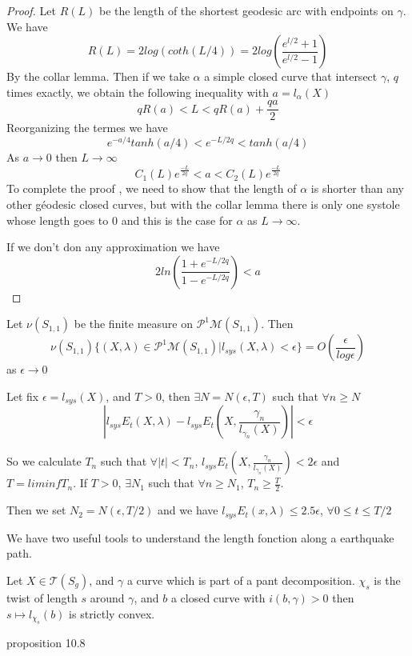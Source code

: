 \begin{proof}
Let $R(L)$ be the length of the shortest geodesic arc with endpoints on $\gamma$. We have \[
R(L)= 2 log(coth(L/4))=2 log(\frac{e^{l/2}+1}{e^{l/2}-1})
\]
By the collar lemma. %
Then if we take $\alpha$ a simple closed curve that intersect $\gamma$, $q$ times exactly, we obtain the following inequality with $a=l_\alpha(X)$ \[
q R(a) < L < q R(a) + \frac{qa}{2}
\]
Reorganizing the termes we have \[
e^{-a/4}tanh(a/4) < e^{-L/2q} < tanh(a/4)
\]
As $a \rightarrow 0$ then $L \rightarrow \infty$
\[
C_1(L) e^{\frac{-L}{2q}} < a < C_2(L) e^{\frac{-L}{2q}}
\]
To complete the proof , we need to show that the length of $\alpha$ is shorter than any other géodesic closed curves, but with the collar lemma there is only one systole whose length goes to $0$ and this is the case for $\alpha$ as $L \rightarrow \infty$. %

If we don't don any approximation we have \[
2 ln(\frac{1+e^{-L/2q}}{1-e^{-L/2q}}) < a
\]

\end{proof}

\begin{thm} Let $\nu(S_{1,1})$ be the finite measure on $\mathcal{P}^1 \mathcal{M}(S_{1,1})$. Then \[
\nu(S_{1,1})\{ (X,\lambda) \in \mathcal{P}^1 \mathcal{M}(S_{1,1}) | l_{sys}(X,\lambda) < \epsilon \} = O(\frac{\epsilon}{log \epsilon})
\] as $\epsilon \rightarrow 0 $
\end{thm}

\hrulefill

Let fix $\epsilon=l_{sys}(X)$, and $T > 0 $, then $\exists N=N(\epsilon,T)$ such that $\forall n \geq N$ \[
| l_{sys}E_t(X,\lambda)-l_{sys}E_t(X,\frac{\gamma_n}{l_{\gamma_n}(X)})| < \epsilon
\]

So we calculate $T_n$ such that $\forall |t| < T_n$,
 $l_{sys}E_t(X,\frac{\gamma_n}{l_{\gamma_n}(X)}) < 2 \epsilon$
and $T=liminf T_n$. If $T>0$, $\exists N_1$ such that $\forall n \geq N_1$, $T_n \geq \frac{T}{2}$.

Then we set $N_2=N(\epsilon,T/2)$ and we have $l_{sys}E_t(x,\lambda) \leq 2.5 \epsilon $, $\forall 0 \leq t \leq T/2$


\hrulefill

We have two useful tools to understand the length fonction along a earthquake path.

\begin{lem}
Let $X \in \mathcal{T}(S_g)$, and $\gamma$ a curve which is part of a pant decomposition.
 $\chi_s$
  is the twist of length $s$ around $\gamma$, and $b$ a closed curve with $i(b,\gamma) > 0$ then $s \mapsto l_{\chi_s}(b)$ is strictly convex.
\end{lem}
\cite{farb2011primer} proposition 10.8

